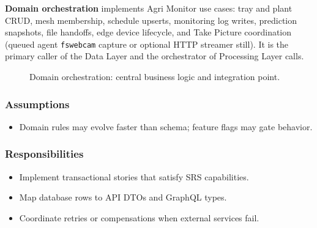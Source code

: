 \textbf{Domain orchestration} implements Agri Monitor use cases: tray and plant CRUD, mesh membership, schedule upserts, monitoring log writes, prediction snapshots, file handoffs, edge device lifecycle, and Take Picture coordination (queued agent \texttt{fswebcam} capture or optional HTTP streamer still). It is the primary caller of the Data Layer and the orchestrator of Processing Layer calls.

\begin{figure}[H]
\centering
{}
\caption{Domain orchestration: central business logic and integration point.}
\label{fig:app-dom}
\end{figure}

\subsubsection{Assumptions}
\begin{itemize}
  \item Domain rules may evolve faster than schema; feature flags may gate behavior.
\end{itemize}

\subsubsection{Responsibilities}
\begin{itemize}
  \item Implement transactional stories that satisfy SRS capabilities.
  \item Map database rows to API DTOs and GraphQL types.
  \item Coordinate retries or compensations when external services fail.
\end{itemize}

